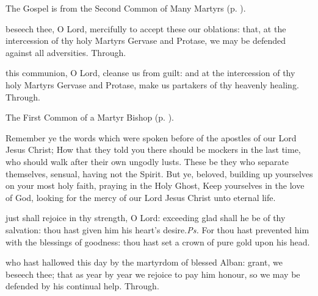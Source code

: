 \begin{rubric}
	The Gospel is from the Second Common of Many Martyrs (p. \pageref{CommonMartyrsIIGospel}).
\end{rubric}


\secret
{} beseech thee, O Lord, mercifully to accept these our oblations: that, at the intercession of thy holy Martyrs Gervase and Protase, we may be defended against all adversities. Through.


\postcommunion
{} this communion, O Lord, cleanse us from guilt: and at the intercession of thy holy Martyrs Gervase and Protase, make us partakers of thy heavenly healing. Through.



\begin{rubric}
	The First Common of a Martyr Bishop (p. \pageref{CommonMartyrBishopI}).
\end{rubric}

 Remember ye the words which were spoken before of the apostles of our Lord Jesus Christ; How that they told you there should be mockers in the last time, who should walk after their own ungodly lusts. These be they who separate themselves, sensual, having not the Spirit. But ye, beloved, building up yourselves on your most holy faith, praying in the Holy Ghost, Keep yourselves in the love of God, looking for the mercy of our Lord Jesus Christ unto eternal life.


\clearpage
{}

\introit
{} just shall rejoice in thy strength, O Lord: exceeding glad shall he be of thy salvation: thou hast given him his heart's desire.\textit{Ps.} For thou hast prevented him with the blessings of goodness: thou hast set a crown of pure gold upon his head.

\collect
{} who hast hallowed this day by the martyrdom of blessed Alban: grant, we beseech thee; that as year by year we rejoice to pay him honour, so we may be defended by his continual help. Through.

